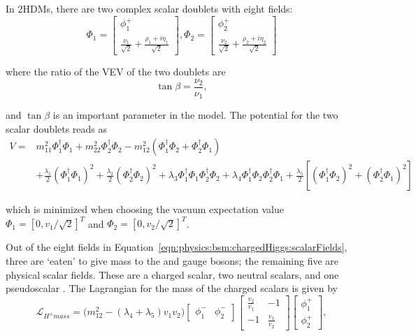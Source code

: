 In 2HDMs, there are two complex scalar doublets with eight fields:
\begin{equation}
	\Phi_1 = \begin{bmatrix} \phi_1^+ \\ \frac{\nu_1}{\sqrt{2}} + \frac{\rho_1+i\eta_1}{\sqrt{2}}  \end{bmatrix} , 
    \Phi_2 = \begin{bmatrix} \phi_2^+ \\ \frac{\nu_2}{\sqrt{2}} + \frac{\rho_2+i\eta_2}{\sqrt{2}}  \end{bmatrix}
    \label{eqn:physics:bsm:chargedHiggs:scalarFields}
\end{equation}

\noindent where the ratio of the VEV of the two doublets are
\begin{equation}
\tan \beta = \frac{\nu_2}{\nu_1},
\end{equation}

\noindent and $\tan \beta$  is an important parameter in the model. The potential for the two scalar doublets reads as
\begin{equation}
\begin{split}
V=& m_{11}^2 \Phi_1^\dagger \Phi_1 + m_{22}^2 \Phi_2^\dagger \Phi_2 - m_{12}^2 ( \Phi_1^\dagger \Phi_2+\Phi_2^\dagger \Phi_1) \\
&  +\frac{\lambda_1}{2}(\Phi_1^\dagger \Phi_1)^2 +\frac{\lambda_2}{2}(\Phi_2^\dagger \Phi_2)^2
+\lambda_3 \Phi_1^\dagger \Phi_1 \Phi_2^\dagger \Phi_2 +\lambda_4 \Phi_1^\dagger \Phi_2 \Phi_2^\dagger \Phi_1
+\frac{\lambda_5}{2}[ (\Phi_1^\dagger \Phi_2)^2 + (\Phi_2^\dagger \Phi_1)^2 ]
\end{split}
\end{equation}

\noindent which is minimized when choosing the vacuum expectation value $\Phi_1= [0,v_1/\sqrt{2}]^T$ and $\Phi_2= [0,v_2/\sqrt{2}]^T$.



\noindent Out of the eight fields in Equation~\ref{eqn:physics:bsm:chargedHiggs:scalarFields}, three are ‘eaten’ to give mass to the \PW and \PZ gauge bosons; the remaining five are physical scalar fields. These are a charged scalar, two neutral scalars, and one pseudoscalar \cite{BRANCO20121}. The Lagrangian for the mass of the charged scalars is given by
\begin{equation}
	\mathcal{L}_{H^{\pm} mass} = \big( m_{12}^2 -(\lambda_4+\lambda_5) v_1 v_2 \big) 
    \begin{bmatrix} \phi_1^- & \phi_2^-  \end{bmatrix}
    \begin{bmatrix} \frac{v_2}{v_1} & -1 \\ -1 & \frac{v_1}{v_2} \end{bmatrix}
    \begin{bmatrix} \phi_1^+ \\ \phi_2^+ \end{bmatrix} ,
\end{equation}

